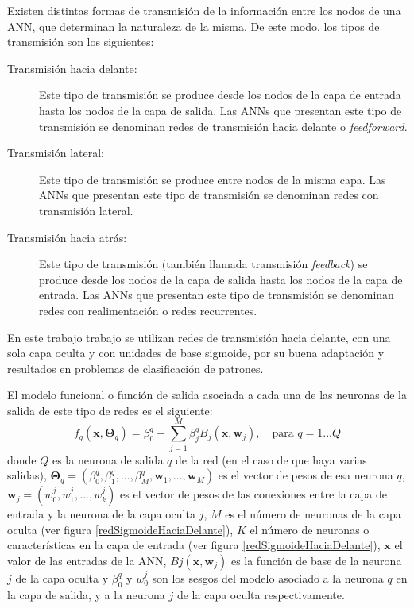 Existen  distintas  formas  de transmisión  de  la información entre los nodos de una ANN,
que determinan la naturaleza de la misma. De este modo, los tipos de transmisión son los
siguientes:
\begin{description}
	\item[Transmisión hacia delante:] Este  tipo  de transmisión  se
	produce desde los nodos de la capa de entrada	hasta los	nodos de la capa de salida.
	Las ANNs que presentan este tipo de transmisión	se
	denominan redes de transmisión hacia	delante o \textit{feedforward}.
	\item[Transmisión lateral:] Este tipo de transmisión se produce	entre nodos
	de la 	misma capa. Las	ANNs que presentan este tipo de transmisión se denominan
	redes con	transmisión lateral.
	\item[Transmisión hacia atrás:] Este tipo de transmisión	(también llamada transmisión
	\textit{feedback}) se	produce desde los nodos de la capa de salida hasta los nodos de
	la capa de entrada. Las	ANNs	que  presentan  este  tipo  de  transmisión  se
	denominan  redes  con  realimentación o redes recurrentes.
 \end{description}
En este trabajo trabajo se utilizan redes de transmisión hacia delante, con una sola
capa oculta y con unidades de base sigmoide, por su buena adaptación y resultados en
problemas de clasificación de patrones.

El modelo funcional o función de salida asociada a cada
una de las neuronas de la salida de este tipo de redes es el siguiente:
\begin{equation}\label{modelof}
	f_{q}\left(\mathbf{x},\mathbf{\Theta}_{q} \right)= \beta_{0}^q + \sum_{j=1}^M
	\beta_{j}^q B_{j} \left( \mathbf{x},\mathbf{w}_{j}\right), \quad \text{para } q=1...Q
\end{equation}
donde $Q$ es la neurona de salida $q$ de la
red (en el caso de que haya varias salidas), $\displaystyle
\mathbf{\Theta}_{q}=\left(\beta_{0}^q,\beta_{1}^q,...,\beta_{M}^q,
\mathbf{w}_{1},...,\mathbf{w}_{M}\right)$ es el vector de pesos de esa neurona
$q$,
$\displaystyle \mathbf{w}_{j}=\left( w_{0}^j,w_{1}^j,...,w_{k}^j\right) $ es el vector de
pesos de las conexiones entre la capa de entrada y la neurona de la capa oculta $j$, $M$
es el número de neuronas de la capa oculta (ver figura \ref{redSigmoideHaciaDelante}), $K$ el número
de neuronas o características en la capa de entrada (ver figura \ref{redSigmoideHaciaDelante}),
$\mathbf{x}$ el valor de las entradas de la ANN, $\displaystyle B{j}\left(
\mathbf{x},\mathbf{w}_{j}\right)$ es la función de base de la neurona $j$
de la capa oculta y $\displaystyle \beta_{0}^q$ y $\displaystyle w_{0}^j$ son los sesgos
del modelo asociado a la neurona $q$ en la capa de salida, y a la neurona $j$ de la capa
oculta respectivamente.

